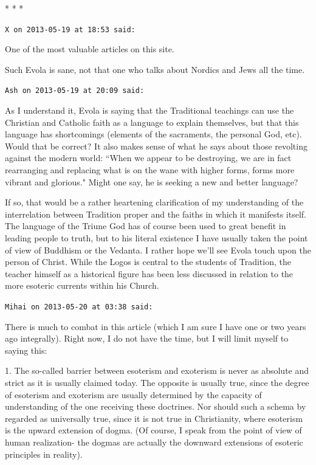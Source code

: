 
\begin{center}* * *\end{center}

\begin{footnotesize}\begin{sffamily}

\texttt{X on 2013-05-19 at 18:53 said: }

One of the most valuable articles on this site.

Such Evola is sane, not that one who talks about Nordics and Jews all the time.


\hfill

\texttt{Ash on 2013-05-19 at 20:09 said: }

As I understand it, Evola is saying that the Traditional teachings can use the Christian and Catholic faith as a language to explain themselves, but that this language has shortcomings (elements of the sacraments, the personal God, etc). Would that be correct? It also makes sense of what he says about those revolting against the modern world: ``When we appear to be destroying, we are in fact rearranging and replacing what is on the wane with higher forms, forms more vibrant and glorious." Might one say, he is seeking a new and better language?

If so, that would be a rather heartening clarification of my understanding of the interrelation between Tradition proper and the faiths in which it manifests itself. The language of the Triune God has of course been used to great benefit in leading people to truth, but to his literal existence I have usually taken the point of view of Buddhism or the Vedanta. I rather hope we'll see Evola touch upon the person of Christ. While the Logos is central to the students of Tradition, the teacher himself as a historical figure has been less discussed in relation to the more esoteric currents within his Church.


\hfill

\texttt{Mihai on 2013-05-20 at 03:38 said: }

There is much to combat in this article (which I am sure I have one or two years ago integrally). Right now, I do not have the time, but I will limit myself to saying this:

1. The so-called barrier between esoterism and exoterism is never as absolute and strict as it is usually claimed today. The opposite is usually true, since the degree of esoterism and exoterism are usually determined by the capacity of understanding of the one receiving these doctrines. Nor should such a schema by regarded as universally true, since it is not true in Christianity, where esoterism is the upward extension of dogma. (Of course, I speak from the point of view of human realization- the dogmas are actually the downward extensions of esoteric principles in reality).


\end{sffamily}
\end{footnotesize}
